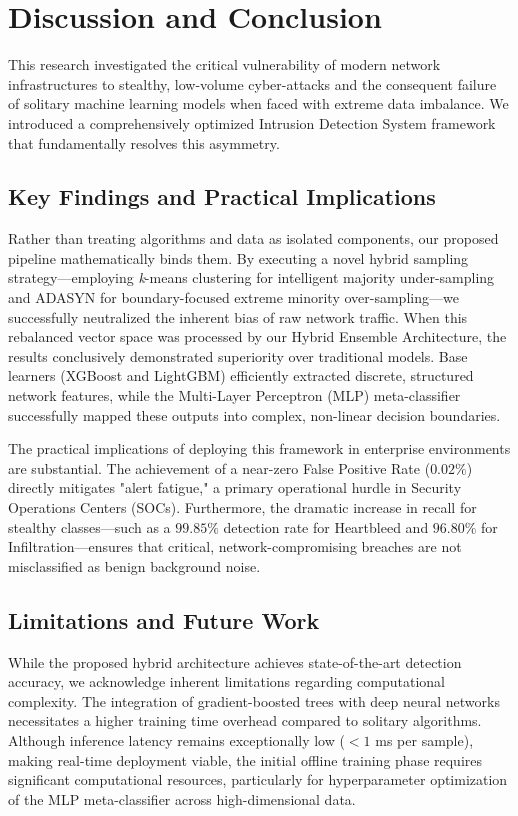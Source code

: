 \section{Discussion and Conclusion}
This research investigated the critical vulnerability of modern network infrastructures to stealthy, low-volume cyber-attacks and the consequent failure of solitary machine learning models when faced with extreme data imbalance. We introduced a comprehensively optimized Intrusion Detection System framework that fundamentally resolves this asymmetry.

\subsection{Key Findings and Practical Implications}
Rather than treating algorithms and data as isolated components, our proposed pipeline mathematically binds them. By executing a novel hybrid sampling strategy—employing \textit{k}-means clustering for intelligent majority under-sampling and ADASYN for boundary-focused extreme minority over-sampling—we successfully neutralized the inherent bias of raw network traffic. When this rebalanced vector space was processed by our Hybrid Ensemble Architecture, the results conclusively demonstrated superiority over traditional models. Base learners (XGBoost and LightGBM) efficiently extracted discrete, structured network features, while the Multi-Layer Perceptron (MLP) meta-classifier successfully mapped these outputs into complex, non-linear decision boundaries.

The practical implications of deploying this framework in enterprise environments are substantial. The achievement of a near-zero False Positive Rate ($0.02\%$) directly mitigates "alert fatigue," a primary operational hurdle in Security Operations Centers (SOCs). Furthermore, the dramatic increase in recall for stealthy classes—such as a $99.85\%$ detection rate for Heartbleed and $96.80\%$ for Infiltration—ensures that critical, network-compromising breaches are not misclassified as benign background noise.

\subsection{Limitations and Future Work}
While the proposed hybrid architecture achieves state-of-the-art detection accuracy, we acknowledge inherent limitations regarding computational complexity. The integration of gradient-boosted trees with deep neural networks necessitates a higher training time overhead compared to solitary algorithms. Although inference latency remains exceptionally low ($<1$ ms per sample), making real-time deployment viable, the initial offline training phase requires significant computational resources, particularly for hyperparameter optimization of the MLP meta-classifier across high-dimensional data.


